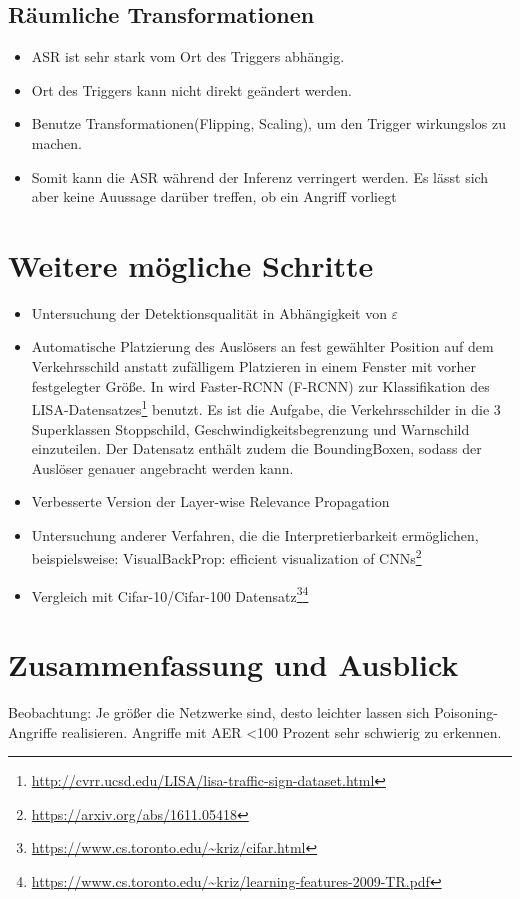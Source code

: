 \documentclass[11pt,a4paper]{article}
\numberwithin{equation}{section}
\begin{document}
	\newpage       
	\subsection{Räumliche Transformationen}
	\begin{itemize}
		\item ASR ist sehr stark vom Ort des Triggers abhängig.
		\item Ort des Triggers kann nicht direkt geändert werden.
		\item Benutze Transformationen(Flipping, Scaling), um den Trigger wirkungslos zu machen.
		\item Somit kann die ASR während der Inferenz verringert werden. Es lässt sich aber keine Auussage darüber treffen, ob ein Angriff vorliegt
	\end{itemize}
	\newpage
	\section{Weitere mögliche Schritte} \label{chapter_weitereSchritte}
	\begin{itemize}
		\item Untersuchung der Detektionsqualität in Abhängigkeit von $\varepsilon$
		\item Automatische Platzierung des Auslösers an fest gewählter Position auf dem Verkehrsschild anstatt zufälligem Platzieren in einem Fenster mit vorher festgelegter Größe. In \cite{badnets} wird  Faster-RCNN (F-RCNN) zur Klassifikation des LISA-Datensatzes\footnote{\url{http://cvrr.ucsd.edu/LISA/lisa-traffic-sign-dataset.html}} benutzt. Es ist die Aufgabe, die Verkehrsschilder in die 3 Superklassen Stoppschild, Geschwindigkeitsbegrenzung und Warnschild einzuteilen. Der Datensatz enthält zudem die BoundingBoxen, sodass der Auslöser genauer angebracht werden kann.
		\item Verbesserte Version der Layer-wise Relevance Propagation
		\item Untersuchung anderer Verfahren, die die Interpretierbarkeit ermöglichen, beispielsweise: VisualBackProp: efficient visualization of CNNs\footnote{\url{https://arxiv.org/abs/1611.05418}}
		\item Vergleich mit Cifar-10/Cifar-100 Datensatz\footnote{\url{https://www.cs.toronto.edu/~kriz/cifar.html}}\footnote{\url{https://www.cs.toronto.edu/~kriz/learning-features-2009-TR.pdf}}
	\end{itemize}
	
	
	\section{Zusammenfassung und Ausblick} \label{chapter_conclusion}
	Beobachtung: Je größer die Netzwerke sind, desto leichter lassen sich Poisoning-Angriffe realisieren.
	Angriffe mit AER <100 Prozent sehr schwierig zu erkennen.
	
\end{document}

